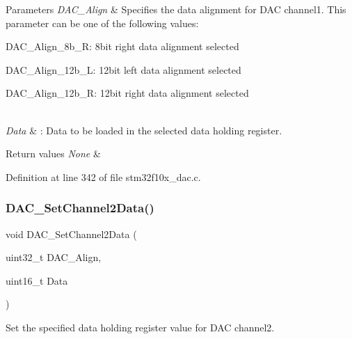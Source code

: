 \begin{DoxyParams}{Parameters}
{\em D\+A\+C\+\_\+\+Align} & Specifies the data alignment for D\+AC channel1. This parameter can be one of the following values\+: \begin{DoxyItemize}
\item D\+A\+C\+\_\+\+Align\+\_\+8b\+\_\+R\+: 8bit right data alignment selected \item D\+A\+C\+\_\+\+Align\+\_\+12b\+\_\+L\+: 12bit left data alignment selected \item D\+A\+C\+\_\+\+Align\+\_\+12b\+\_\+R\+: 12bit right data alignment selected \end{DoxyItemize}
\\
\hline
{\em Data} & \+: Data to be loaded in the selected data holding register. \\
\hline
\end{DoxyParams}

\begin{DoxyRetVals}{Return values}
{\em None} & \\
\hline
\end{DoxyRetVals}


Definition at line 342 of file stm32f10x\+\_\+dac.\+c.

\mbox{\label{group___d_a_c___exported___functions_ga44e12006ec186791378d132da8541552}} 
\subsubsection{\texorpdfstring{D\+A\+C\+\_\+\+Set\+Channel2\+Data()}{DAC\_SetChannel2Data()}}
{\footnotesize\ttfamily void D\+A\+C\+\_\+\+Set\+Channel2\+Data (\begin{DoxyParamCaption}\item[{uint32\+\_\+t}]{D\+A\+C\+\_\+\+Align,  }\item[{uint16\+\_\+t}]{Data }\end{DoxyParamCaption})}



Set the specified data holding register value for D\+AC channel2. 


